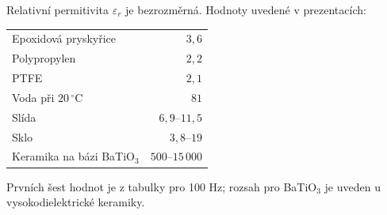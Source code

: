 Relativní permitivita $\varepsilon_r$ je bezrozměrná. Hodnoty uvedené v prezentacích:
\begin{center}\begin{tabular}{lr}
Epoxidová pryskyřice & $3{,}6$\\
Polypropylen & $2{,}2$\\
PTFE & $2{,}1$\\
Voda při $20\,^{\circ}\mathrm C$ & $81$\\
Slída & $6{,}9$--$11{,}5$\\
Sklo & $3{,}8$--$19$\\
Keramika na bázi BaTiO$_3$ & $500$--$15\,000$
\end{tabular}\end{center}
Prvních šest hodnot je z tabulky pro 100 Hz; rozsah pro BaTiO$_3$ je uveden u vysokodielektrické keramiky.

